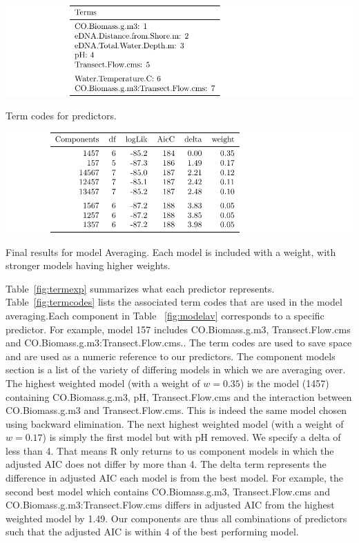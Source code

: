 \begin{table}[H]
\includegraphics{Chapter5Images/termcodes.pdf}
\caption{\hspace{1mm} Term codes for predictors.}
\label{fig:termcodes}
\end{table}


\begin{table}[H]
\includegraphics{Chapter5Images/modelAV.pdf}
\caption{Final results for model Averaging. Each model is included with a weight, with stronger models having higher weights.}
\label{fig:modelav}
\end{table}







Table~\ref{fig:termexp} summarizes what each predictor represents. Table~\ref{fig:termcodes} lists the associated term codes that are used in the model averaging.Each component in Table ~\ref{fig:modelav} corresponds to a specific predictor. For example, model 157 includes CO.Biomass.g.m3, Transect.Flow.cms and CO.Biomass.g.m3:Transect.Flow.cms.. The term codes are used to save space and are used as a numeric reference to our predictors. The component models section is a list of the variety of differing models in which we are averaging over. The highest weighted model (with a weight of $w=0.35$) is the model (1457) containing CO.Biomass.g.m3, pH, Transect.Flow.cms and the interaction between CO.Biomass.g.m3 and Transect.Flow.cms. This is indeed the same model chosen using backward elimination. The next highest weighted model (with a weight of $w=0.17$) is simply the first model but with pH removed. We specify a delta of less than 4. That means R only returns to us component models in which the adjusted AIC does not differ by more than 4. The delta term represents the difference in adjusted AIC each model is from the best model. For example, the second best model which contains CO.Biomass.g.m3, Transect.Flow.cms and CO.Biomass.g.m3:Transect.Flow.cms differs in adjusted AIC from the highest weighted model by 1.49. Our components are thus all combinations of predictors such that the adjusted AIC is within 4 of the best performing model.


